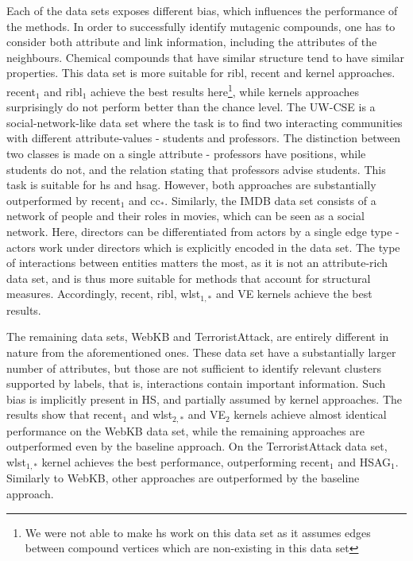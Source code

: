Each of the data sets exposes different bias, which influences the performance of the methods.
In order to successfully identify mutagenic compounds, one has to consider both attribute and link information, including the attributes of the neighbours.
Chemical compounds that have similar structure tend to have similar properties.
This data set is more suitable for \gls{ribl}, \gls{recent} and kernel approaches.
\gls{recent}$_1$ and \gls{ribl}$_1$ achieve the best results here\footnote{We were not able to make \gls{hs} work on this data set as it assumes edges between compound vertices which are non-existing in this data set}, while kernels approaches surprisingly do not perform better than the chance level.
The UW-CSE is a social-network-like data set where the task is to find two interacting  communities with different attribute-values - students and professors.
The distinction between two classes is made on a single attribute - professors have positions, while students do not, and the relation stating that professors advise students.
This task is suitable for \gls{hs} and \gls{hsag}.
However, both approaches are substantially outperformed by \gls{recent}$_1$ and \gls{cc}$_*$.
Similarly, the IMDB data set consists of a network of people and their roles in movies, which can be seen as a social network.
Here, directors can be differentiated from actors by a single edge type - actors work under directors which is explicitly encoded in the data set.
The type of interactions between entities matters the most, as it is not an attribute-rich data set, and is thus more suitable for methods that account for structural measures.
Accordingly, \gls{recent}, \gls{ribl}, \gls{wlst}$_{1,*}$ and VE  kernels achieve the best results.





The remaining data sets, WebKB and TerroristAttack, are entirely different in nature from the aforementioned ones.
These data set have a substantially larger number of attributes, but those are not sufficient to identify relevant clusters supported by labels, that is,  interactions contain important information.
Such bias is implicitly present in HS, and partially assumed by kernel approaches.
The results show that \gls{recent}$_1$ and \gls{wlst}$_{2,*}$ and VE$_2$ kernels achieve almost identical performance on the WebKB data set, while the remaining approaches are outperformed even by the baseline approach.
On the TerroristAttack data set, \gls{wlst}$_{1,*}$ kernel achieves the best performance, outperforming \gls{recent}$_1$ and HSAG$_1$.
Similarly to WebKB, other approaches are outperformed by the baseline approach.






